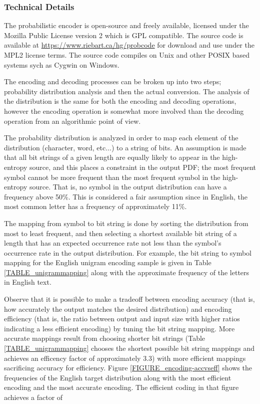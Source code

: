 \documentclass[12pt]{article}
\theoremstyle{remark}
\theoremstyle{definition}
\theoremstyle{definition}
\theoremstyle{definition}
\begin{document}
\subsubsection{Technical Details}
The probabilistic encoder is open-source and freely available, licensed under the Mozilla Public License version 2 which is GPL compatible. The source code is available at \url{https://www.riebart.ca/hg/probcode} for download and use under the MPL2 license terms. The source code compiles on Unix and other POSIX based systems sych as Cygwin on Windows.

The encoding and decoding processes can be broken up into two steps; probability distribution analysis and then the actual conversion. The analysis of the distribution is the same for both the encoding and decoding operations, however the encoding operation is somewhat more involved than the decoding operation from an algorithmic point of view.

The probability distribution is analyzed in order to map each element of the distribution (character, word, etc$\ldots$) to a string of bits. An assumption is made that all bit strings of a given length are equally likely to appear in the high-entropy source, and this places a constraint in the output PDF; the most frequent symbol cannot be more frequent than the most frequent symbol in the high-entropy source. That is, no symbol in the output distribution can have a frequency above 50\%. This is considered a fair assumption since in English, the most common letter has a frequency of approximately 11\%.

The mapping from symbol to bit string is done by sorting the distribution from most to least frequent, and then selecting a shortest available bit string of a length that has an expected occurrence rate not less than the symbol's occurrence rate in the output distribution. For example, the bit string to symbol mapping for the English unigram encoding sample is given in Table \ref{TABLE_unigrammapping} along with the approximate frequency of the letters in English text.

Observe that it is possible to make a tradeoff between encoding accuracy (that is, how accurately the output matches the desired distribution) and encoding efficiency (that is, the ratio between output and input size with higher ratios indicating a less efficient encoding) by tuning the bit string mapping. More accurate mappings result from choosing shorter bit strings (Table \ref{TABLE_unigrammapping} chooses the shortest possible bit string mappings and achieves an efficency factor of approximately 3.3) with more efficient mappings sacrificing accuracy for efficiency. Figure \ref{FIGURE_encoding-accvseff} shows the frequencies of the English target distribution along with the most efficient encoding and the most accurate encoding. The efficient coding in that figure achieves a factor of 
\end{document}
